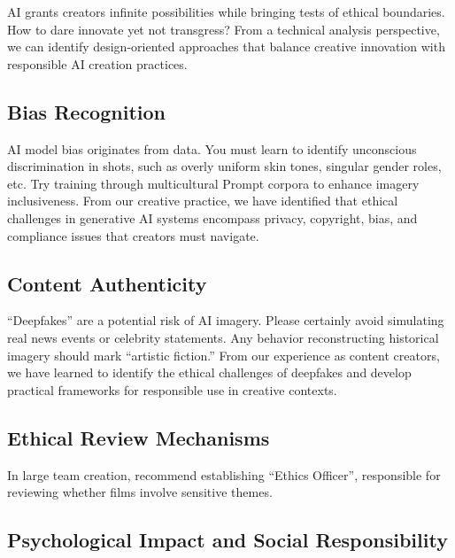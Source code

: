AI grants creators infinite possibilities while bringing tests of ethical boundaries. How to dare innovate yet not transgress? From a technical analysis perspective, we can identify design-oriented approaches that balance creative innovation with responsible AI creation practices.

\subsection{Bias Recognition}

AI model bias originates from data. You must learn to identify unconscious discrimination in shots, such as overly uniform skin tones, singular gender roles, etc. Try training through multicultural Prompt corpora to enhance imagery inclusiveness. From our creative practice, we have identified that ethical challenges in generative AI systems encompass privacy, copyright, bias, and compliance issues that creators must navigate.

\subsection{Content Authenticity}

``Deepfakes'' are a potential risk of AI imagery. Please certainly avoid simulating real news events or celebrity statements. Any behavior reconstructing historical imagery should mark ``artistic fiction.'' From our experience as content creators, we have learned to identify the ethical challenges of deepfakes and develop practical frameworks for responsible use in creative contexts.

\subsection{Ethical Review Mechanisms}

In large team creation, recommend establishing ``Ethics Officer'', responsible for reviewing whether films involve sensitive themes.

\subsection{Psychological Impact and Social Responsibility}

